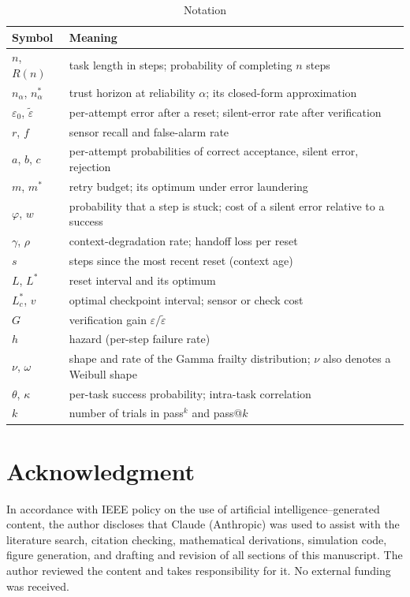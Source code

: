 \documentclass[journal]{IEEEtran}
\newcommand{\et}{\tilde{\varepsilon}}
\newcommand{\nal}{n_{\alpha}}
\begin{document}
\begin{table}[!h]
\centering
\caption{Notation}
\label{tab:notation}
\footnotesize
\begin{tabularx}{\columnwidth}{@{}lX@{}}
\toprule
Symbol & Meaning\\
\midrule
$n$, $R(n)$ & task length in steps; probability of completing $n$ steps\\
$\nal$, $n^*_\alpha$ & trust horizon at reliability $\alpha$; its closed-form approximation\\
$\varepsilon_0$, $\et$ & per-attempt error after a reset; silent-error rate after verification\\
$r$, $f$ & sensor recall and false-alarm rate\\
$a$, $b$, $c$ & per-attempt probabilities of correct acceptance, silent error, rejection\\
$m$, $m^*$ & retry budget; its optimum under error laundering\\
$\varphi$, $w$ & probability that a step is stuck; cost of a silent error relative to a success\\
$\gamma$, $\rho$ & context-degradation rate; handoff loss per reset\\
$s$ & steps since the most recent reset (context age)\\
$L$, $L^*$ & reset interval and its optimum\\
$L_c^*$, $v$ & optimal checkpoint interval; sensor or check cost\\
$G$ & verification gain $\varepsilon/\et$\\
$h$ & hazard (per-step failure rate)\\
$\nu$, $\omega$ & shape and rate of the Gamma frailty distribution; $\nu$ also denotes a Weibull shape\\
$\theta$, $\kappa$ & per-task success probability; intra-task correlation\\
$k$ & number of trials in pass$^k$ and pass@$k$\\
\bottomrule
\end{tabularx}
\end{table}

\section*{Acknowledgment}
In accordance with IEEE policy on the use of artificial intelligence--generated content, the author discloses that Claude (Anthropic) was used to assist with the literature search, citation checking, mathematical derivations, simulation code, figure generation, and drafting and revision of all sections of this manuscript. The author reviewed the content and takes responsibility for it. No external funding was received.



\end{document}
